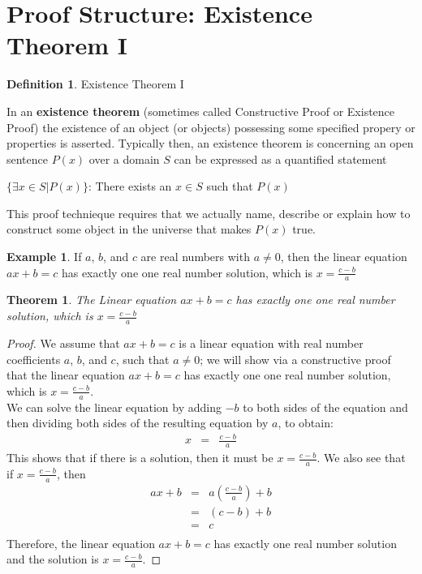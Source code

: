 \documentclass{book}
\newtheorem{theorem}{Theorem}[section]
\theoremstyle{definition}
\newtheorem{definition}{Definition}[section]
\newtheorem{example}{Example}[definition]
\theoremstyle{remark}
\begin{document}
\newpage
\section{Proof Structure: Existence Theorem I}

\begin{definition} 
Existence Theorem I

In an {\bf existence theorem} (sometimes called Constructive Proof or Existence Proof) the existence of an object (or objects) possessing some specified propery or properties is asserted. Typically then, an existence theorem is concerning an open sentence $P(x)$ over a domain $S$ can be expressed as a quantified statement
	\begin{center}
		$\{ \exists x \in S | P(x) \}$: There exists an $x \in S$ such that $P(x)$
	\end{center}
This proof technieque requires that we actually name, describe or explain how to construct some object in the universe that makes $P(x)$ true.
\end{definition}

\begin{example}
If $a$, $b$, and $c$ are real numbers with $a \neq 0$, then the linear equation $ax + b = c$ has exactly one one real number solution, which is $x = \frac{c-b}{a}$ \\

\begin{tcolorbox}
	\begin{theorem}
		The Linear equation $ax + b = c$ has exactly one one real number solution, which is $x = \frac{c-b}{a}$
	\end{theorem}
\end{tcolorbox}

\begin{proof}
We assume that $ax + b = c$ is a linear equation  with real number coefficients $a$, $b$, and $c$, such that $a \neq 0$; we will show via a constructive proof that the linear equation $ax + b = c$ has exactly one one real number solution, which is $x = \frac{c-b}{a}$. \\
We can solve the linear equation by adding $-b$ to both sides of the equation and then dividing both sides of the resulting equation by $a$, to obtain: 
	\begin{eqnarray*}
		x & = & \frac{c-b}{a}
	\end{eqnarray*}
This shows that if there is a solution, then it must be $x = \frac{c-b}{a}$. We also see that if $x = \frac{c-b}{a}$, then
	\begin{eqnarray*}
		ax + b & = & a(\frac{c-b}{a}) + b  \nonumber \\
		& = & (c-b) + b \nonumber \\
		& = & c \nonumber \\
	\end{eqnarray*}
Therefore, the linear equation $ax + b = c$ has exactly one real number solution and the solution is $x = \frac{c-b}{a}$. 
\end{proof}
\end{example}
\end{document}
